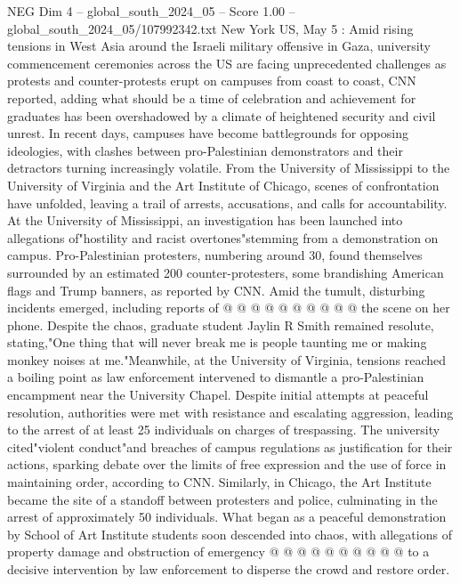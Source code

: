 \begin{textsample}{NEG Dim 4 – global\_south\_2024\_05 – Score 1.00 – global\_south\_2024\_05/107992342.txt}  \label{ex:f4_neg_256}
New York US, May 5 : Amid rising tensions in West Asia around the Israeli military offensive in Gaza, university commencement ceremonies across the US are facing unprecedented challenges as protests and counter-protests erupt on campuses from coast to coast, CNN reported, adding what should be a time of celebration and achievement for graduates has been overshadowed by a climate of heightened security and civil unrest.
In recent days, campuses have become battlegrounds for opposing ideologies, with clashes between pro-Palestinian demonstrators and their detractors turning increasingly volatile.
From the University of Mississippi to the University of Virginia and the Art Institute of Chicago, scenes of confrontation have unfolded, leaving a trail of arrests, accusations, and calls for accountability.
At the University of Mississippi, an investigation has been launched into allegations of"hostility and racist overtones"stemming from a demonstration on campus.
Pro-Palestinian protesters, numbering around 30, found themselves surrounded by an estimated 200 counter-protesters, some brandishing American flags and Trump banners, as reported by CNN.
Amid the tumult, disturbing incidents emerged, including reports of @ @ @ @ @ @ @ @ @ @ the scene on her phone.
Despite the chaos, graduate student Jaylin R Smith remained resolute, stating,"One thing that will never break me is people taunting me or making monkey noises at me."Meanwhile, at the University of Virginia, tensions reached a boiling point as law enforcement intervened to dismantle a pro-Palestinian encampment near the University Chapel.
Despite initial attempts at peaceful resolution, authorities were met with resistance and escalating aggression, leading to the arrest of at least 25 individuals on charges of trespassing.
The university cited"violent conduct"and breaches of campus regulations as justification for their actions, sparking debate over the limits of free expression and the use of force in maintaining order, according to CNN.
Similarly, in Chicago, the Art Institute became the site of a standoff between protesters and police, culminating in the arrest of approximately 50 individuals.
What began as a peaceful demonstration by School of Art Institute students soon descended into chaos, with allegations of property damage and obstruction of emergency @ @ @ @ @ @ @ @ @ @ to a decisive intervention by law enforcement to disperse the crowd and restore order.

\end{textsample}
